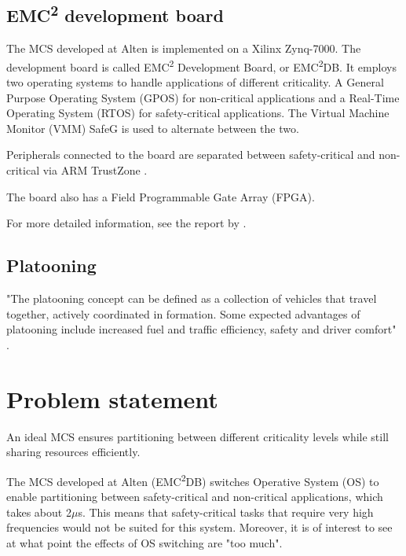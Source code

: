 \subsection{EMC\textsuperscript{2} development board}
\label{sec:mces}
The MCS developed at Alten is implemented on a Xilinx Zynq-7000. The development board is called EMC\textsuperscript{2} Development Board, or EMC\textsuperscript{2}DB. It employs two operating systems to handle applications of different criticality. A General Purpose Operating System (GPOS) for non-critical applications and a Real-Time Operating System (RTOS) for safety-critical applications. The Virtual Machine Monitor (VMM) SafeG \cite{website:safeg} is used to alternate between the two. %

Peripherals connected to the board are separated between safety-critical and non-critical via ARM TrustZone \cite{website:ARM}.

The board also has a Field Programmable Gate Array (FPGA).


For more detailed information, see the report by \cite{zaki2016}.

\subsection{Platooning}
\label{sec:platooning}
"The platooning concept can be defined as a collection of  vehicles that travel together, actively coordinated in formation. Some expected advantages of platooning include increased fuel and traffic  efficiency, safety and driver  comfort" \cite{bergenhem}.

\section{Problem statement}
\label{sec:problem}
An ideal MCS ensures partitioning between different criticality levels while still sharing resources efficiently. %

The MCS developed at Alten (EMC\textsuperscript{2}DB) switches Operative System (OS) to enable partitioning between safety-critical and non-critical applications, which takes about 2$\mu$s. This means that safety-critical tasks that require very high frequencies would not be suited for this system. Moreover, it is of interest to see at what point the effects of OS switching are "too much". %

